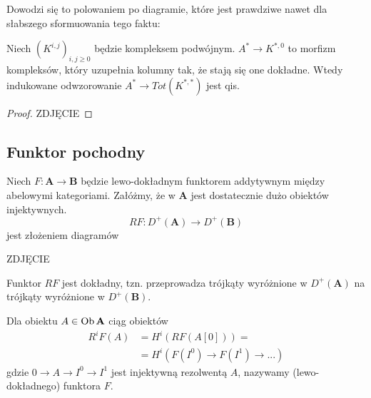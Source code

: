Dowodzi się to polowaniem po diagramie, które jest prawdziwe nawet dla słabszego sformuowania tego faktu:
\begin{lemma}
  Niech $(K^{i,j})_{i,j\geq 0}$ będzie kompleksem podwójnym. $A^*\to K^{*,0}$ to morfizm kompleksów, który uzupełnia kolumny tak, że stają się one dokładne. Wtedy indukowane odwzorowanie $A^*\to Tot(K^{*,*})$ jest qis.
\end{lemma}

\begin{proof}
  {\large\color{red}ZDJĘCIE}
\end{proof}

\subsection{Funktor pochodny}

\begin{definition}
  Niech $F:\mathbf{A}\to\mathbf{B}$ będzie lewo-dokładnym funktorem addytywnym między abelowymi kategoriami. Załóżmy, że w $\mathbf{A}$ jest dostatecznie dużo obiektów injektywnych. 
  $$RF:D^+(\mathbf{A})\to D^+(\mathbf{B})$$
  jest złożeniem diagramów
  \begin{center}\end{center}
  {\large\color{red}ZDJĘCIE}
\end{definition}

\begin{fact}
  Funktor $RF$ jest dokładny, tzn. przeprowadza trójkąty wyróżnione w $D^+(\mathbf{A})$ na trójkąty wyróżnione w $D^+(\mathbf{B})$.
\end{fact}

\begin{definition}
  Dla obiektu $A\in\operatorname{Ob}\mathbf{A}$ ciąg obiektów
  \begin{align*}
    R^iF(A)&=H^i(RF(A[0]))=\\ 
           &=H^i(F(I^0)\to F(I^1)\to ...)
  \end{align*}
  gdzie $0\to A\to I^0\to I^1$ jest injektywną rezolwentą $A$, nazywamy  (lewo-dokładnego) funktora $F$.
\end{definition}

